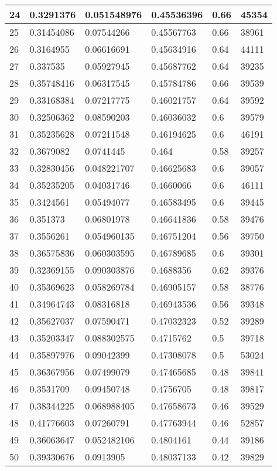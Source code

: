 \begin{longtable}{|l|l|l|l|l|l|}
24 & 0.3291376 & 0.051548976 & 0.45536396 & 0.66 & 45354 \\ \hline 
25 & 0.31454086 & 0.07544266 & 0.45567763 & 0.66 & 38961 \\ \hline 
26 & 0.3164955 & 0.06616691 & 0.45634916 & 0.64 & 44111 \\ \hline 
27 & 0.337535 & 0.05927945 & 0.45687762 & 0.64 & 39235 \\ \hline 
28 & 0.35748416 & 0.06317545 & 0.45784786 & 0.66 & 39539 \\ \hline 
29 & 0.33168384 & 0.07217775 & 0.46021757 & 0.64 & 39592 \\ \hline 
30 & 0.32506362 & 0.08590203 & 0.46036032 & 0.6 & 39579 \\ \hline 
31 & 0.35235628 & 0.07211548 & 0.46194625 & 0.6 & 46191 \\ \hline 
32 & 0.3679082 & 0.0741445 & 0.464 & 0.58 & 39257 \\ \hline 
33 & 0.32830456 & 0.048221707 & 0.46625683 & 0.6 & 39057 \\ \hline 
34 & 0.35235205 & 0.04031746 & 0.4660066 & 0.6 & 46111 \\ \hline 
35 & 0.3424561 & 0.05494077 & 0.46583495 & 0.6 & 39445 \\ \hline 
36 & 0.351373 & 0.06801978 & 0.46641836 & 0.58 & 39476 \\ \hline 
37 & 0.3556261 & 0.054960135 & 0.46751204 & 0.56 & 39750 \\ \hline 
38 & 0.36575836 & 0.060303595 & 0.46789685 & 0.6 & 39301 \\ \hline 
39 & 0.32369155 & 0.090303876 & 0.4688356 & 0.62 & 39376 \\ \hline 
40 & 0.35369623 & 0.058269784 & 0.46905157 & 0.58 & 38776 \\ \hline 
41 & 0.34964743 & 0.08316818 & 0.46943536 & 0.56 & 39348 \\ \hline 
42 & 0.35627037 & 0.07590471 & 0.47032323 & 0.52 & 39289 \\ \hline 
43 & 0.35203347 & 0.088302575 & 0.4715762 & 0.5 & 39718 \\ \hline 
44 & 0.35897976 & 0.09042399 & 0.47308078 & 0.5 & 53024 \\ \hline 
45 & 0.36367956 & 0.07499079 & 0.47465685 & 0.48 & 39841 \\ \hline 
46 & 0.3531709 & 0.09450748 & 0.4756705 & 0.48 & 39817 \\ \hline 
47 & 0.38344225 & 0.068988405 & 0.47658673 & 0.46 & 39529 \\ \hline 
48 & 0.41776603 & 0.07260791 & 0.47763944 & 0.46 & 52857 \\ \hline 
49 & 0.36063647 & 0.052482106 & 0.4804161 & 0.44 & 39186 \\ \hline 
50 & 0.39330676 & 0.0913905 & 0.48037133 & 0.42 & 39829 \\ \hline 
\end{longtable}